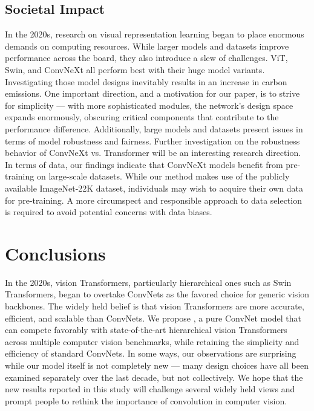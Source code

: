 \subsection{Societal Impact}
\label{sec:impact}
In the 2020s, research on visual representation learning began to place enormous demands on computing resources. While larger models and datasets improve performance across the board, they also introduce a slew of challenges. ViT, Swin, and ConvNeXt all perform best with their huge model variants. Investigating those model designs inevitably results in an increase in carbon emissions. One important direction, and a motivation for our paper, is to strive for simplicity --- with more sophisticated modules, the network's design space expands enormously, obscuring critical components that contribute to the performance difference. Additionally, large models and datasets present issues in terms of model robustness and fairness. 
Further investigation on the robustness behavior of ConvNeXt vs. Transformer will be an interesting research direction. In terms of data, our findings indicate that ConvNeXt models benefit from pre-training on large-scale datasets. While our method makes use of the publicly available ImageNet-22K dataset, individuals may wish to acquire their own data for pre-training. A more circumspect and responsible approach to data selection is required to avoid potential concerns with data biases.

\section{Conclusions}
In the 2020s, vision Transformers, particularly hierarchical ones such as Swin Transformers, began to overtake ConvNets as the favored choice for generic vision backbones. The widely held belief is that vision Transformers are more accurate, efficient, and scalable than ConvNets. We propose , a pure ConvNet model that can compete favorably with state-of-the-art hierarchical vision Transformers across multiple computer vision benchmarks, while retaining the simplicity and efficiency of standard ConvNets. In some ways, our observations are surprising while our \cnn{} model itself is not completely new --- many design choices have all been examined separately over the last decade, but not collectively. We hope that the new results reported in this study will challenge several widely held views and prompt people to rethink the importance of convolution in computer vision.






